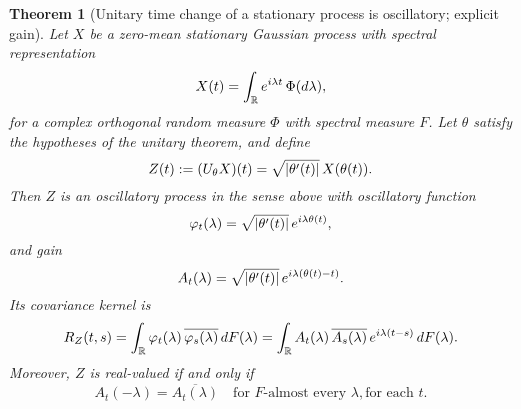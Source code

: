 \documentclass{article}
\newcommand{\assign}{:=}
\newtheorem{theorem}{Theorem}
\begin{document}
\begin{theorem}
  [Unitary time change of a stationary process is oscillatory; explicit gain]
  Let $X$ be a zero-mean stationary Gaussian process with spectral
  representation
  \[ X (t) = \int_{\mathbb{R}} e^{i \lambda t}  \hspace{0.17em} \Phi (d
     \lambda), \]
  for a complex orthogonal random measure $\Phi$ with spectral measure $F$.
  Let $\theta$ satisfy the hypotheses of the unitary theorem, and define
  \[ Z (t) \assign (U_{\theta} X) (t) = \sqrt{| \theta' (t) |} 
     \hspace{0.17em} X (\theta (t)) . \]
  Then $Z$ is an oscillatory process in the sense above with oscillatory
  function
  \[ \varphi_t (\lambda) = \sqrt{| \theta' (t) |}  \hspace{0.17em} e^{i
     \lambda \theta (t)}, \]
  and gain
  \[ A_t (\lambda) = \sqrt{| \theta' (t) |}  \hspace{0.17em} e^{i \lambda
     (\theta (t) - t)} . \]
  Its covariance kernel is
  \[ R_Z (t, s) = \int_{\mathbb{R}} \varphi_t (\lambda) \hspace{0.17em}
     \overline{\varphi_s (\lambda)} \hspace{0.17em} dF (\lambda) =
     \int_{\mathbb{R}} A_t (\lambda) \hspace{0.17em} \overline{A_s (\lambda)}
     \hspace{0.17em} e^{i \lambda (t - s)}  \hspace{0.17em} dF (\lambda) . \]
  Moreover, $Z$ is real-valued if and only if
  \[ A_t  (- \lambda) = \overline{A_t (\lambda)} \quad \text{for } F
     \text{-almost every } \lambda, \text{for each } t. \]
\end{theorem}
\end{document}
